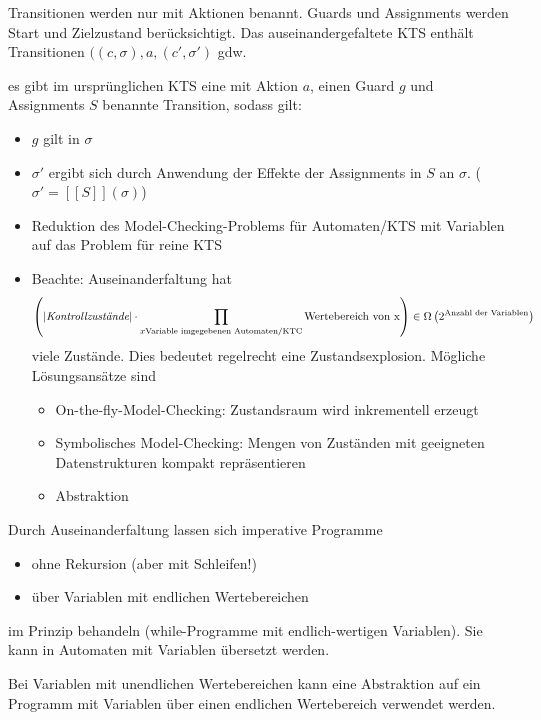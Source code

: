 Transitionen werden nur mit Aktionen benannt. Guards und Assignments werden Start und Zielzustand berücksichtigt. Das auseinandergefaltete KTS enthält Transitionen $((c, \sigma), a, (c', \sigma')$ gdw.

es gibt im ursprünglichen KTS eine mit Aktion $a$, einen Guard $g$ und Assignments $S$ benannte Transition, sodass gilt:
\begin{itemize}
	\item $g$ gilt in $\sigma$
	\item $\sigma'$ ergibt sich durch Anwendung der Effekte der Assignments in $S$ an $\sigma$. ($\sigma' = [[S]](\sigma)$)
\end{itemize}


\begin{bem}

	\begin{itemize}
		\item Reduktion des Model-Checking-Problems für Automaten/KTS mit Variablen auf das Problem für reine KTS
		\item Beachte: Auseinanderfaltung hat 
		\[\left(|\textit{Kontrollzustände}| \cdot \prod_{x \text{Variable im \\ gegebenen Automaten/KTC}}\text{Wertebereich von x}\right) \in \Omega\left(2^{\text{Anzahl der Variablen}}\right)\] 
		 viele Zustände. Dies bedeutet regelrecht eine Zustandsexplosion. Mögliche Lösungsansätze sind
		 \begin{itemize}
		 	\item On-the-fly-Model-Checking: Zustandsraum wird inkrementell erzeugt
		 	\item Symbolisches Model-Checking: Mengen von Zuständen mit geeigneten Datenstrukturen kompakt repräsentieren
		 	\item Abstraktion
		 \end{itemize}
	\end{itemize}

	Durch Auseinanderfaltung lassen sich imperative Programme 
	\begin{itemize}
		\item ohne Rekursion (aber mit Schleifen!)
		\item über Variablen mit endlichen Wertebereichen
	\end{itemize}
	im Prinzip behandeln (while-Programme mit endlich-wertigen Variablen). Sie kann in Automaten mit Variablen übersetzt werden.
	
	Bei Variablen mit unendlichen Wertebereichen kann eine Abstraktion auf ein Programm mit Variablen über einen endlichen Wertebereich verwendet werden.
\end{bem}

